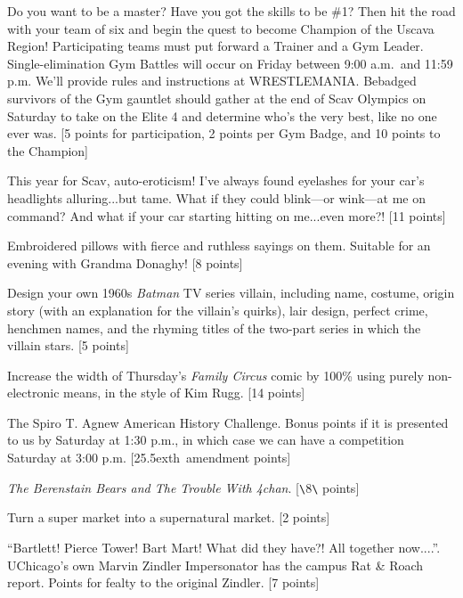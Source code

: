 \documentclass{book}
\def\th{\raise.5ex\hbox{\scriptsize th}}
\begin{document}
\begin{list}{}{}
\item Do you want to be a master? Have you got the skills to be \#1? Then hit the road with your team of six and begin the quest to become Champion of the Uscava Region! Participating teams must put forward a Trainer and a Gym Leader. Single-elimination Gym Battles will occur on Friday between 9:00 a.m.\ and 11:59 p.m. We'll provide rules and instructions at WRESTLEMANIA. Bebadged survivors of the Gym gauntlet should gather at the end of Scav Olympics on Saturday to take on the Elite 4 and determine who's the very best, like no one ever was. [5 points for participation, 2 points per Gym Badge, and 10 points to the Champion]

\item This year for Scav, auto-eroticism! I've always found eyelashes for your car's headlights alluring...but tame. What if they could blink---or wink---at me on command? And what if your car starting hitting on me...even more?! [11 points]

\item  Embroidered pillows with fierce and ruthless sayings on them. Suitable for an evening with Grandma Donaghy! [8 points]

\item Design your own 1960s \emph{Batman} TV series villain, including name, costume, origin story (with an explanation for the villain's quirks), lair design, perfect crime, henchmen names, and the rhyming titles of the two-part series in which the villain stars. [5 points]

\item Increase the width of Thursday's \emph{Family Circus} comic by 100\% using purely non-electronic means, in the style of Kim Rugg. [14 points]

\item The Spiro T. Agnew American History Challenge.  Bonus points if it is presented to us by Saturday at 1:30 p.m., in which case we can have a competition Saturday at 3:00 p.m. [25\th\ amendment points]

\item \emph{The Berenstain Bears and The Trouble With 4chan}. [\verb+\+8\verb+\+ points]

\item  Turn a super market into a supernatural market. [2 points] 

\item ``Bartlett! Pierce Tower! Bart Mart! What did they have?! All together now....''. UChicago's own Marvin Zindler Impersonator has the campus Rat \& Roach report. Points for fealty to the original Zindler. [7 points]


\end{list}
\end{document}
